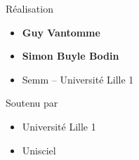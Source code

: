 \begin{frame}
\begin{minipage}{0.50\textwidth}
  \medskip

  Réalisation
  \begin{itemize}
    \item {\bf Guy Vantomme}
    \item {\bf \small Simon Buyle Bodin} 
    \item Semm -- Université Lille 1
  \end{itemize}

  \medskip

  Soutenu par 
  \begin{itemize}
    \item Université Lille 1
    \item Unisciel
  \end{itemize}

  \end{minipage}  



\end{frame}


